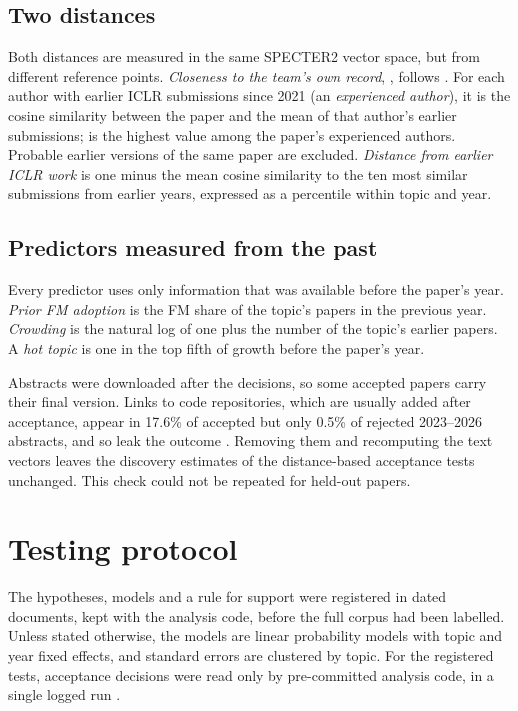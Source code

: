 \subsection{Two distances}
Both distances are measured in the same SPECTER2 vector space, but from different reference points.
\emph{Closeness to the team's own record}, \Fmax{}, follows \citet{bao2025persistence}. For each author with earlier
ICLR submissions since 2021 (an \emph{experienced author}), it is the cosine similarity between the paper and the mean
of that author's earlier submissions; \Fmax{} is the highest value among the paper's experienced authors. Probable
earlier versions of the same paper are excluded. \emph{Distance from earlier ICLR work} is one minus the mean cosine
similarity to the ten most similar submissions from earlier years, expressed as a percentile within topic and year.

\subsection{Predictors measured from the past}
Every predictor uses only information that was available before the paper's year. \emph{Prior FM adoption} is the FM
share of the topic's papers in the previous year. \emph{Crowding} is the natural log of one plus the number of the
topic's earlier papers. A \emph{hot topic} is one in the top fifth of growth before the paper's year.

Abstracts were downloaded after the decisions, so some accepted papers carry their final version. Links to code
repositories, which are usually added after acceptance, appear in 17.6\% of accepted but only 0.5\% of rejected
2023--2026 abstracts, and so leak the outcome \citep{kaufman2012leakage}. Removing them and recomputing the text vectors
leaves the discovery estimates of the distance-based acceptance tests unchanged. This check could not be repeated for
held-out papers.

\section{Testing protocol}
\label{sec:protocol}

The hypotheses, models and a rule for support were registered in dated documents, kept with the analysis code, before
the full corpus had been labelled. Unless stated otherwise, the models are linear probability models with topic and
year fixed effects, and standard errors are clustered by topic. For the registered tests, acceptance decisions were read
only by pre-committed analysis code, in a single logged run \citep{nosek2018preregistration,vandenakker2021preregistration}.

